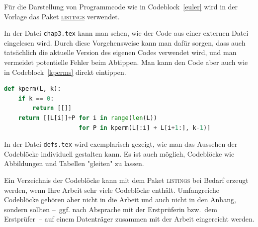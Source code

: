 Für die Darstellung von Programmcode wie in Codeblock~\ref{euler} wird in der
Vorlage das Paket \href{https://www.ctan.org/pkg/listings}{\textsc{listings}}
verwendet.



In der Datei \texttt{chap3.tex} kann man sehen, wie der Code aus einer
externen Datei eingelesen wird.  Durch diese Vorgehensweise kann man dafür
sorgen, dass auch tatsächlich die aktuelle Version des eigenen Codes verwendet
wird, und man vermeidet potentielle Fehler beim Abtippen.  Man kann den Code
aber auch wie in Codeblock~\ref{kperms} direkt eintippen.

\begin{lstlisting}[language=Python,caption=Variationen,label=kperms]
def kperm(L, k):
    if k == 0:
        return [[]]
    return [[L[i]]+P for i in range(len(L))
                     for P in kperm(L[:i] + L[i+1:], k-1)]  
\end{lstlisting}

In der Datei \texttt{defs.tex} wird exemplarisch gezeigt, wie man das Aussehen
der Codeblöcke individuell gestalten kann.  Es ist auch möglich, Codeblöcke
wie Abbildungen und Tabellen "gleiten" zu lassen.

Ein Verzeichnis der Codeblöcke kann mit dem Paket \textsc{listings} bei Bedarf
erzeugt werden, wenn Ihre Arbeit sehr viele Codeblöcke enthält.  Umfangreiche
Codeblöcke gehören aber nicht in die Arbeit und auch nicht in den Anhang,
sondern sollten --~ggf. nach Absprache mit der Erstprüferin bzw.\ dem
Erstprüfer~-- auf einem Datenträger zusammen mit der Arbeit eingereicht
werden.